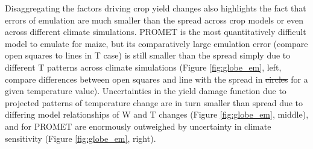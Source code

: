 \documentclass[gmdd]{copernicus} %
\providecommand{\DIFadd}[1]{{\protect\color{blue}\uwave{#1}}} %
\providecommand{\DIFdel}[1]{{\protect\color{red}\sout{#1}}}                      %
\providecommand{\DIFaddbegin}{} %
\providecommand{\DIFaddend}{} %
\providecommand{\DIFdelbegin}{} %
\providecommand{\DIFdelend}{} %
\begin{document}
\DIFdelbegin %

\DIFdelend Disaggregating the factors driving crop yield changes also highlights the fact that errors of emulation are much smaller than the spread across crop models or even across different climate simulations.
PROMET is the most quantitatively difficult model to emulate for maize, but its %
comparatively large emulation error (compare open squares to lines in T case) is still smaller than the spread simply due to different T patterns across climate simulations (Figure \ref{fig:globe_em}, left, compare differences between open squares and line with the spread in \DIFdelbegin \DIFdel{circles }\DIFdelend \DIFaddbegin \DIFadd{dots }\DIFaddend for a given temperature value). Uncertainties in the yield damage function due to projected patterns of temperature change are in turn smaller than spread due to differing model relationships of W and T changes (Figure \ref{fig:globe_em}, middle), and for PROMET are enormously outweighed by uncertainty in climate sensitivity (Figure \ref{fig:globe_em}, right).
\end{document}
